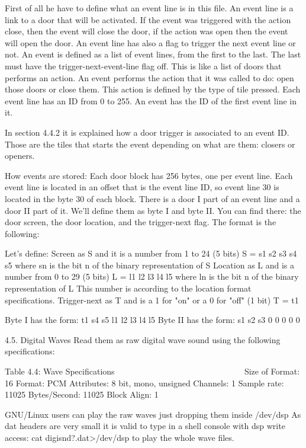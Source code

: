  First of all he have to define what an event line is in this file. An
 event line is a link to a door that will be activated. If the event was
 triggered with the action close, then the event will close the door, if
 the action was open then the event will open the door. An event line has
 also a flag to trigger the next event line or not.
 An event is defined as a list of event lines, from the first to the last.
 The last must have the trigger-next-event-line flag off. This is like a
 list of doors that performs an action.
 An event performs the action that it was called to do: open those doors or
 close them. This action is defined by the type of tile pressed.
 Each event line has an ID from 0 to 255. An event has the ID of the first
 event line in it.

 In section 4.4.2 it is explained how a door trigger is associated to an
 event ID. Those are the tiles that starts the event depending on what are
 them: closers or openers.

 How events are stored:
 Each door block has 256 bytes, one per event line. Each event line is
 located in an offset that is the event line ID, so event line 30 is
 located in the byte 30 of each block.
 There is a door I part of an event line and a door II part of it. We'll
 define them as byte I and byte II.
 You can find there: the door screen, the door location, and the
 trigger-next flag. The format is the following:

 Let's define:
  Screen as S and it is a number from 1 to 24 (5 bits)
   S = s1 s2 s3 s4 s5
    where sn is the bit n of the binary representation of S
  Location as L and is a number from 0 to 29 (5 bits)
   L = l1 l2 l3 l4 l5
    where ln is the bit n of the binary representation of L
   This number is according to the location format specifications.
  Trigger-next as T and is a 1 for "on" or a 0 for "off" (1 bit)
   T = t1

 Byte I  has the form: t1 s4 s5 l1 l2 l3 l4 l5
 Byte II has the form: s1 s2 s3  0  0  0  0  0

4.5. Digital Waves
 Read them as raw digital wave sound using the following specifications:

                   Table 4.4: Wave Specifications
                   ~~~~~~~~~~~~~~~~~~~~~~~~~~~~~~
  Size of Format: 16
  Format:         PCM
  Attributes:     8 bit, mono, unsigned
  Channels:       1
  Sample rate:    11025
  Bytes/Second:   11025
  Block Align:    1

 GNU/Linux users can play the raw waves just dropping them inside /dev/dsp
 As dat headers are very small it is valid to type in a shell console with
 dsp write access: cat digisnd?.dat>/dev/dsp to play the whole wave files.

